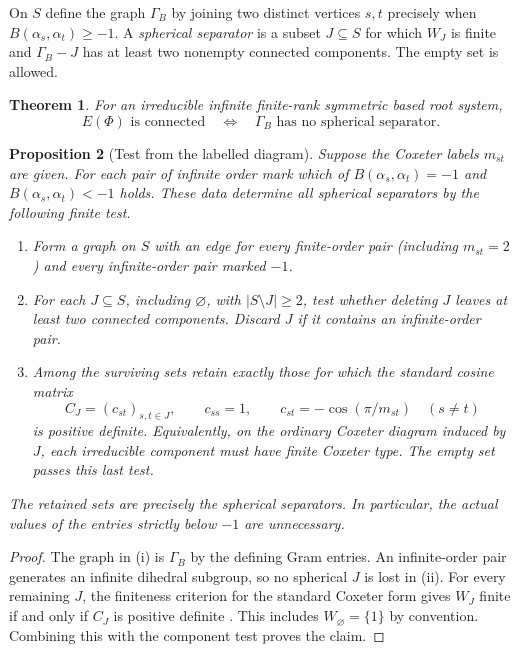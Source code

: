 \documentclass[11pt,reqno]{amsart}
\theoremstyle{plain}
\newtheorem{theorem}{Theorem}[section]
\newtheorem{proposition}[theorem]{Proposition}
\theoremstyle{definition}
\theoremstyle{remark}
\numberwithin{equation}{section}
\begin{document}
On $S$ define the graph $\Gamma_B$ by joining two distinct vertices
$s,t$ precisely when $B(\alpha_s,\alpha_t)\ge -1$. A \emph{spherical
separator} is a subset $J\subseteq S$ for which $W_J$ is finite and
$\Gamma_B-J$ has at least two nonempty connected components. The
empty set is allowed.

\begin{theorem}\label{p14:main}
For an irreducible infinite finite-rank symmetric based root system,
\[
 E(\Phi)\text{ is connected}
 \quad\Longleftrightarrow\quad
 \Gamma_B\text{ has no spherical separator}.
\]
\end{theorem}

\begin{proposition}[Test from the labelled diagram]\label{p14:label-test}
Suppose the Coxeter labels $m_{st}$ are given. For each pair of
infinite order mark which of $B(\alpha_s,\alpha_t)=-1$ and
$B(\alpha_s,\alpha_t)<-1$ holds. These data determine all spherical
separators by the following finite test.
\begin{enumerate}[label=\textup{(\roman*)},leftmargin=*]
\item Form a graph on $S$ with an edge for every finite-order pair
(including $m_{st}=2$) and every infinite-order pair marked $-1$.
\item For each $J\subseteq S$, including $\varnothing$, with
$|S\setminus J|\ge2$, test whether deleting $J$ leaves at least two
connected components. Discard $J$ if it contains an infinite-order
pair.
\item Among the surviving sets retain exactly those for which the
standard cosine matrix
\[
  C_J=(c_{st})_{s,t\in J},\qquad c_{ss}=1,\qquad
  c_{st}=-\cos(\pi/m_{st})\quad(s\ne t)
\]
is positive definite. Equivalently, on the ordinary Coxeter diagram
induced by $J$, each irreducible component must have finite Coxeter
type. The empty set passes this last test.
\end{enumerate}
The retained sets are precisely the spherical separators. In
particular, the actual values of the entries strictly below $-1$ are
unnecessary.
\end{proposition}
\begin{proof}
The graph in (i) is $\Gamma_B$ by the defining Gram entries.
An infinite-order pair generates an infinite dihedral subgroup, so
no spherical $J$ is lost in (ii). For every remaining $J$, the
finiteness criterion for the standard Coxeter form gives
$W_J$ finite if and only if $C_J$ is positive definite
\cite[Theorem~6.12.9]{Davis2008}. This includes
$W_\varnothing=\{1\}$ by convention. Combining this with the
component test proves the claim.
\end{proof}
\end{document}
